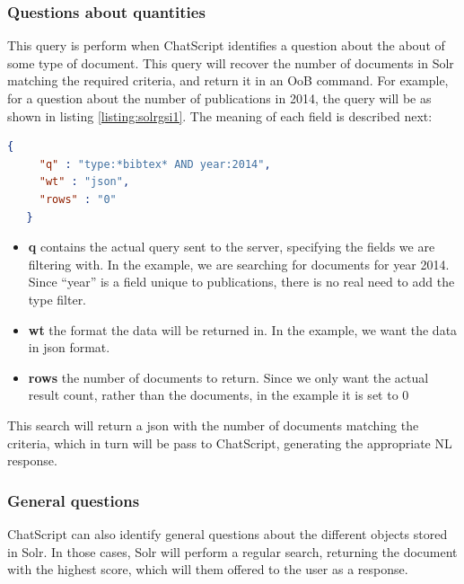 \subsubsection{Questions about quantities}

This query is perform when ChatScript identifies a question about the about of some type of document. This query will recover the number of documents in Solr matching the required criteria, and return it in an \ac{OoB} command. For example, for a question about the number of publications in 2014, the query will be as shown in listing \ref{listing:solrgsi1}. The meaning of each field is described next:

\begin{center} 
  \begin{lstlisting}[language=json, caption=Example json query for Solr, label=listing:solrgsi1]
   {
     "q" : "type:*bibtex* AND year:2014",
     "wt" : "json",
     "rows" : "0"
   }  
  \end{lstlisting}
\end{center}

\begin{itemize}
  \item \textbf{q} contains the actual query sent to the server, specifying the fields we are filtering with. In the example, we are searching for documents for year 2014. Since ``year'' is a field unique to publications, there is no real need to add the type filter.
  \item \textbf{wt} the format the data will be returned in. In the example, we want the data in json format.
  \item \textbf{rows} the number of documents to return. Since we only want the actual result count, rather than the documents, in the example it is set to 0
\end{itemize}

This search will return a json with the number of documents matching the criteria, which in turn will be pass to ChatScript, generating the appropriate \ac{NL} response.

\subsubsection{General questions}

ChatScript can also identify general questions about the different objects stored in Solr. In those cases, Solr will perform a regular search, returning the document with the highest score, which will them offered to the user as a response.

